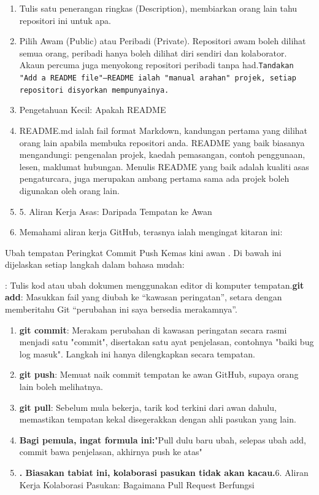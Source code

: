 \begin{enumerate}
  \item Tulis satu penerangan ringkas (Description), membiarkan orang lain tahu repositori ini untuk apa.
  \item Pilih Awam (Public) atau Peribadi (Private). Repositori awam boleh dilihat semua orang, peribadi hanya boleh dilihat diri sendiri dan kolaborator. Akaun percuma juga menyokong repositori peribadi tanpa had.\texttt{Tandakan "Add a README file"—README ialah "manual arahan" projek, setiap repositori disyorkan mempunyainya.\allowbreak }
  \item Pengetahuan Kecil: Apakah README
  \item README.md ialah fail format Markdown, kandungan pertama yang dilihat orang lain apabila membuka repositori anda. README yang baik biasanya mengandungi: pengenalan projek, kaedah pemasangan, contoh penggunaan, lesen, maklumat hubungan. Menulis README yang baik adalah kualiti asas pengaturcara, juga merupakan ambang pertama sama ada projek boleh digunakan oleh orang lain.
  \item 5. Aliran Kerja Asas: Daripada Tempatan ke Awan
  \item Memahami aliran kerja GitHub, terasnya ialah mengingat kitaran ini:
\end{enumerate}

\begin{tcbinfo}{Ubah tempatan Peringkat Commit Push Kemas kini awan}
. Di bawah ini dijelaskan setiap langkah dalam bahasa mudah:

\end{tcbinfo}


: Tulis kod atau ubah dokumen menggunakan editor di komputer tempatan.\textbf{git add}: Masukkan fail yang diubah ke “kawasan peringatan”, setara dengan memberitahu Git “perubahan ini saya bersedia merakamnya”.

\begin{enumerate}
  \item \textbf{git commit}: Merakam perubahan di kawasan peringatan secara rasmi menjadi satu "commit", disertakan satu ayat penjelasan, contohnya "baiki bug log masuk". Langkah ini hanya dilengkapkan secara tempatan.
  \item \textbf{git push}: Memuat naik commit tempatan ke awan GitHub, supaya orang lain boleh melihatnya.
  \item \textbf{git pull}: Sebelum mula bekerja, tarik kod terkini dari awan dahulu, memastikan tempatan kekal disegerakkan dengan ahli pasukan yang lain.
  \item \textbf{Bagi pemula, ingat formula ini:}"Pull dulu baru ubah, selepas ubah add, commit bawa penjelasan, akhirnya push ke atas"
  \item \textbf{. Biasakan tabiat ini, kolaborasi pasukan tidak akan kacau.}6. Aliran Kerja Kolaborasi Pasukan: Bagaimana Pull Request Berfungsi
\end{enumerate}

